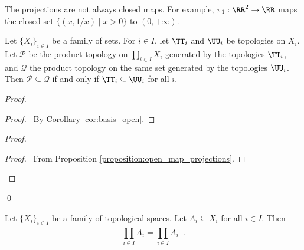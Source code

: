 \begin{example}
    The projections are not always closed maps. For example, $\pi_1 : \RR^2 \rightarrow \RR$ maps the closed set $\{ (x,1/x) \mid x > 0 \}$ to $(0, + \infty)$.
\end{example}

\begin{proposition}
    Let $\{ X_i \}_{i \in I}$ be a family of sets. For $i \in I$, let $\TT_i$ and $\UU_i$ be topologies
    on $X_i$. Let $\mathcal{P}$ be the product topology on $\prod_{i \in I} X_i$ generated by
    the topologies $\TT_i$, and $\mathcal{Q}$ the product topology on the same set generated by the topologies
    $\UU_i$. Then $\mathcal{P} \subseteq \mathcal{Q}$ if and only if $\TT_i \subseteq \UU_i$ for all $i$.
\end{proposition}

\begin{proof}
    \pf
    \begin{proof}
        \pf\ By Corollary \ref{cor:basis_open}.
    \end{proof}
    \begin{proof}
        \begin{proof}
            \pf\ From Proposition \ref{proposition:open_map_projections}.
        \end{proof}
    \end{proof}
    \qed
\end{proof}

\begin{proposition}[Choice]
    \label{proposition:closure_in_product_topology_without_choice}
    Let $\{ X_i \}_{i \in I}$ be a family of topological spaces. Let $A_i \subseteq X_i$ for all $i \in I$.
    Then
    \[ \overline{\prod_{i \in I} A_i} = \prod_{i \in I} \overline{A_i} \enspace . \]
\end{proposition}

